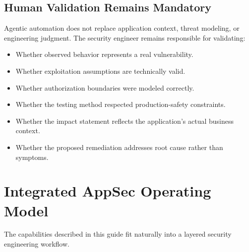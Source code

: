 \documentclass[11pt]{article}
\begin{document}
\subsection{Human Validation Remains Mandatory}

Agentic automation does not replace application context, threat modeling, or engineering judgment. The security engineer remains responsible for validating:

\begin{itemize}
  \item Whether observed behavior represents a real vulnerability.
  \item Whether exploitation assumptions are technically valid.
  \item Whether authorization boundaries were modeled correctly.
  \item Whether the testing method respected production-safety constraints.
  \item Whether the impact statement reflects the application's actual business context.
  \item Whether the proposed remediation addresses root cause rather than symptoms.
\end{itemize}

\section{Integrated AppSec Operating Model}

The capabilities described in this guide fit naturally into a layered security engineering workflow.
\end{document}
